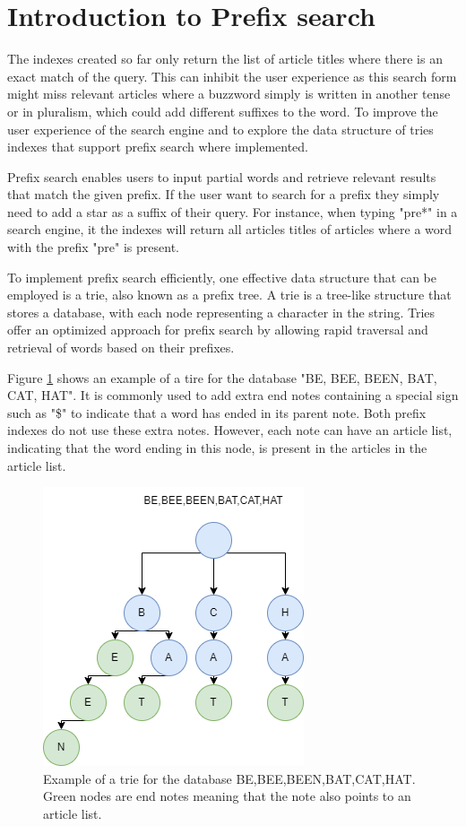 \section{Introduction to Prefix search}
The indexes created so far only return the list of article titles where there is an exact match of the query. This can inhibit the user experience as this search form might miss relevant articles where a buzzword simply is written in another tense or in  pluralism, which could add different suffixes to the word. To improve the user experience of the search engine and to explore the data structure of tries indexes that support prefix search where implemented.

Prefix search enables users to input partial words and retrieve relevant results that match the given prefix. If the user want to search for a prefix they simply need to add a star as a suffix of their query. For instance, when typing "pre*" in a search engine, it the indexes will return all articles titles of articles where a word with the prefix "pre" is present. 

To implement prefix search efficiently, one effective data structure that can be employed is a trie, also known as a prefix tree. A trie is a tree-like structure that stores a database, with each node representing a character in the string. Tries offer an optimized approach for prefix search by allowing rapid traversal and retrieval of words based on their prefixes.

Figure \ref{fig:trie-st-example} shows an example of a tire for the database "BE, BEE, BEEN, BAT, CAT, HAT". It is commonly used to add extra end notes containing a special sign such as "\$" to indicate that a word has ended in its parent note. Both prefix indexes do not use these extra notes. However, each note can have an article list, indicating that the word ending in this node, is present in the articles in the article list.  

\begin{figure}[ht!]
    \centering
    \includegraphics[width=.5\textwidth]{LaTeX/Figures/trie.png}
    \caption{Example of a trie for the database BE,BEE,BEEN,BAT,CAT,HAT. Green nodes are end notes meaning that the note also points to an article list.}
    \label{fig:trie-st-example}
\end{figure}